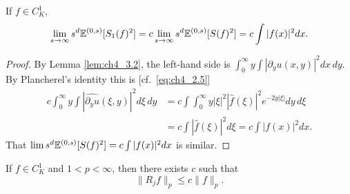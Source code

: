 \begin{lemma}\label{lem:ch4_3.4}
If $f \in C_K^1$,
\[
    \lim_{s\to\infty} s^d\mathbb{E}^{(0,s)}[S_1(f)^2] = c\lim_{s\to\infty} s^d\mathbb{E}^{(0,s)}[S(f)^2] = c\int |f(x)|^2dx.
\]
\end{lemma}

\begin{proof}
By Lemma \ref{lem:ch4_3.2}, the left-hand side is $\int_0^{\infty} y\int|\partial_y u(x,y)|^2dx\,dy$. By Plancherel's identity this is [cf.\ \eqref{eq:ch4_2.5}]
\begin{align*}
    c\int_0^\infty y \int |\widehat{\partial_y u}(\xi, y)|^2d\xi\, dy &=c\int\int_0^{\infty} y|\xi|^2|\widehat{f}(\xi)|^2e^{-2y|\xi|}dy\,d\xi \\
    &= c\int|\widehat{f}(\xi)|^2d\xi = c\int|f(x)|^2dx.
\end{align*}
That $\lim s^d\mathbb{E}^{(0,s)}[S(f)^2] = c\int|f(x)|^2dx$ is similar.
\end{proof}

\begin{theorem}\label{thm:ch4_3.5}
If $f \in C_K^1$ and $1 < p < \infty$, then there exists $c$ such that
\[\|R_j f\|_p \leq c\|f\|_p.\]
\end{theorem}

